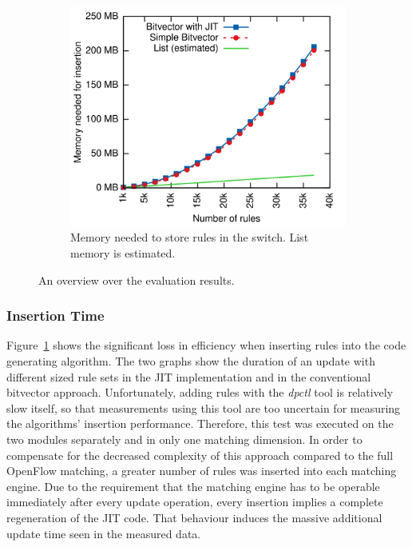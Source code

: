 \documentclass[conference]{IEEEtran}
\begin{document}
\begin{figure}
\begin{subfigure}{.32\linewidth}
        \label{fig:eval-times}
    \end{subfigure}
    ~
    \begin{subfigure}{.32\linewidth}
        \centering
        \includegraphics[width=\textwidth]{images/eval_mem}
        \caption{Memory needed to store rules in the switch. List memory is estimated.}
        \label{fig:eval-mem}
    \end{subfigure}
    \caption{An overview over the evaluation results.}
    \vspace{-0.5cm}
\end{figure}

\subsubsection{Insertion Time}
\label{sec:eval-ins}
Figure~\ref{fig:eval-times} shows the significant loss in efficiency when inserting rules into the code generating algorithm.
The two graphs show the duration of an update with different sized rule sets in the 
JIT implementation and in the conventional bitvector approach.
Unfortunately, adding rules with the \textit{dpctl} tool is relatively slow itself, so that measurements using this tool
are too uncertain for measuring the algorithms' insertion performance.
Therefore, this test was executed on the two modules separately and in only one matching dimension.
In order to compensate for the decreased complexity of this approach compared to the full OpenFlow matching,
a greater number of rules was inserted into each matching engine.
Due to the requirement that the matching engine has to be operable 
immediately after every update operation, every insertion implies a complete regeneration of the JIT code.
That behaviour induces the massive additional update time seen in the measured data.
\end{document}
